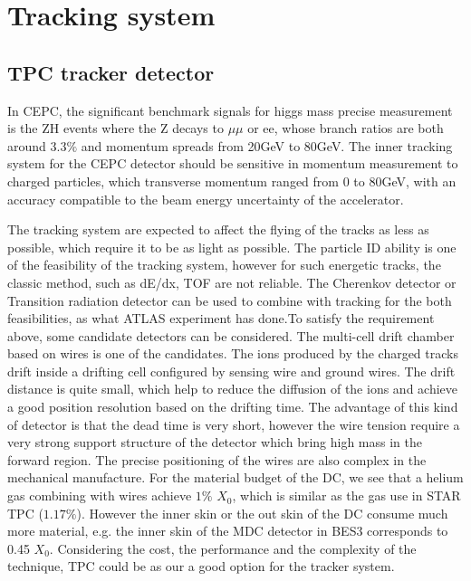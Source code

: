 \chapter{Tracking system}
\label{Chapter:TrackingSystem}


%
%
\section{TPC tracker detector}
In CEPC, the significant benchmark signals for higgs mass precise measurement is the ZH events where the Z decays to $\mu\mu$ or ee, whose branch ratios are both around 3.3$\%$ and momentum spreads from 20GeV to 80GeV. The inner tracking system for the CEPC detector should be sensitive in momentum measurement to charged particles, which transverse momentum ranged from 0 to 80GeV, with an accuracy compatible to the beam energy uncertainty of the accelerator.

The tracking system are expected to affect the flying of the tracks as less as possible, which require it to be as light as possible. The particle ID ability is one of the feasibility of the tracking system, however for such energetic tracks, the classic method, such as dE/dx, TOF are not reliable. The Cherenkov detector or Transition radiation detector can be used to combine with tracking for the both feasibilities, as what ATLAS experiment has done.To satisfy the requirement above, some candidate detectors can be considered. The multi-cell drift chamber based on wires is one of the candidates. The ions produced by the charged tracks drift inside a drifting cell configured by sensing wire and ground wires. The drift distance is quite small, which help to reduce the diffusion of the ions and achieve a good position resolution based on the drifting time. The advantage of this kind of detector is that the dead time is very short, however the wire tension require a very strong support structure of the detector which bring high mass in the forward region. The precise positioning of the wires are also complex in the mechanical manufacture. For the material budget of the DC, we see that a helium gas combining with wires achieve $1\%$ $X_0$, which is similar as the gas use in STAR TPC ($1.17\%$). However the inner skin or the out skin of the DC consume much more material, e.g. the inner skin of the MDC detector in BES3 corresponds to 0.45 $X_0$. Considering the cost, the performance and the complexity of the technique, TPC could be as our a good option for the tracker system.

